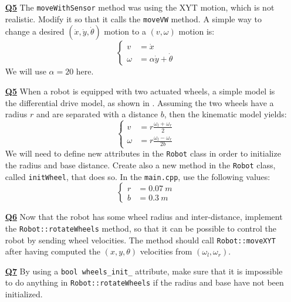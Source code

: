 \documentclass{ecnreport}
\begin{document}
\begin{itemize}
\medskip\item[\textbf{\underline{Q5}}] The \texttt{moveWithSensor} method was using the XYT motion, which is not realistic. 
Modify it so that it calls the \texttt{moveVW} method. A simple way to change a desired $(\dot x, \dot y, \dot \theta)$ motion
to a $(v, \omega)$ motion is:
\begin{equation*}\left\{\begin{array}{ll}
 v& = \dot x\\
 \omega &= \alpha\dot y + \dot \theta\end{array}\right.
\end{equation*}We will use $\alpha = 20$ here.

\medskip\item[\textbf{\underline{Q5}}] When a robot is equipped with two actuated wheels, a simple model is the differential drive model, as shown in . Assuming the two wheels have a radius $r$ and are separated with a distance $b$, then the kinematic model yields:
\begin{equation*}\label{eq:dk}
\left\{\begin{array}{ll}
v &= \displaystyle r \frac{\omega_l + \omega_r}{2} \\
\omega &= \displaystyle r \frac{\omega_l - \omega_r}{2b}
\end{array}\right.
\end{equation*}
We will need to define new attributes in the \texttt{Robot} class in order to initialize the radius and base distance.
Create also a new method in the \texttt{Robot} class, called \texttt{initWheel}, that does so. In the \texttt{main.cpp}, use the following values:
\begin{equation*}
\left\{\begin{array}{ll}
r &= 0.07 ~m \\
b &= 0.3 ~m
\end{array}\right.
\end{equation*}

\medskip\item[\textbf{\underline{Q6}}] Now that the robot has some wheel radius and inter-distance, implement the \texttt{Robot::rotateWheels} method, so that it can be possible to control the robot by sending wheel velocities. 
The method should call \texttt{Robot::moveXYT} after having computed the $(x,y,\theta)$ velocities from $(\omega_l, \omega_r)$.

\medskip\item[\textbf{\underline{Q7}}] By using a \texttt{bool wheels\_init\_} attribute, make sure that it is impossible to do anything in \texttt{Robot::rotateWheels} if the radius and base have not been initialized.


\end{itemize}
\end{document}
